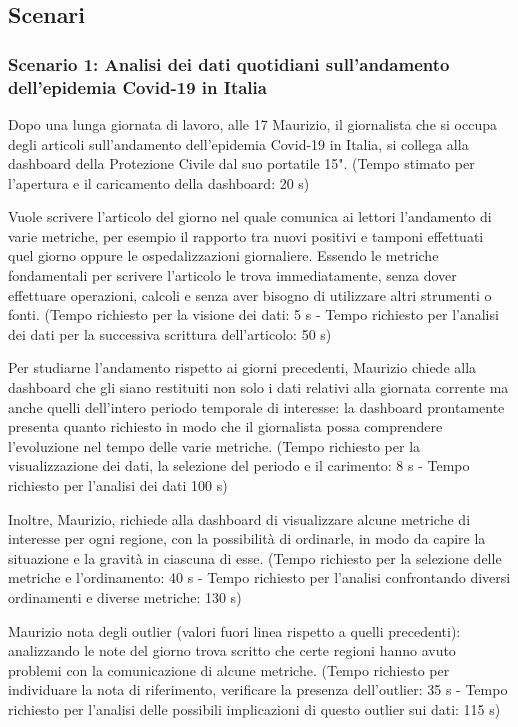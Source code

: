 \subsection{Scenari}
\subsubsection*{Scenario 1: Analisi dei dati quotidiani sull'andamento dell'epidemia Covid-19 in Italia}
Dopo una lunga giornata di lavoro, alle 17 Maurizio, il giornalista che si occupa degli articoli sull'andamento dell'epidemia Covid-19 in Italia, si collega alla dashboard della Protezione Civile dal suo portatile 15".
(Tempo stimato per l'apertura e il caricamento della dashboard: 20 s)

Vuole scrivere l'articolo del giorno nel quale comunica ai lettori l'andamento di varie metriche, per esempio il rapporto tra nuovi positivi e tamponi effettuati quel giorno oppure le ospedalizzazioni giornaliere. Essendo le metriche fondamentali per scrivere l'articolo le trova immediatamente, senza dover effettuare operazioni, calcoli e senza aver bisogno di utilizzare altri strumenti o fonti.  
(Tempo richiesto per la visione dei dati: 5 s - Tempo richiesto per l'analisi dei dati per la successiva scrittura dell'articolo: 50 s)

Per studiarne l'andamento rispetto ai giorni precedenti, Maurizio chiede alla dashboard che gli siano restituiti non solo i dati relativi alla giornata corrente ma anche quelli dell'intero periodo temporale di interesse: la dashboard prontamente presenta quanto richiesto in modo che il giornalista possa comprendere l'evoluzione nel tempo delle varie metriche. (Tempo richiesto per la visualizzazione dei dati, la selezione del periodo e il carimento: 8 s - Tempo richiesto per l'analisi dei dati 100 s)

Inoltre, Maurizio, richiede alla dashboard di visualizzare alcune metriche di interesse per ogni regione, con la possibilità di ordinarle, in modo da capire la situazione e la gravità in ciascuna di esse. (Tempo richiesto per la selezione delle metriche e l'ordinamento: 40 s - Tempo richiesto per l'analisi confrontando diversi ordinamenti e diverse metriche: 130 s)

Maurizio nota degli outlier (valori fuori linea rispetto a quelli precedenti):  analizzando le note del giorno trova scritto che certe regioni hanno avuto problemi con la comunicazione di alcune metriche. (Tempo richiesto per individuare la nota di riferimento, verificare la presenza dell'outlier: 35 s - Tempo richiesto per l'analisi delle possibili implicazioni di questo outlier sui dati: 115 s)

